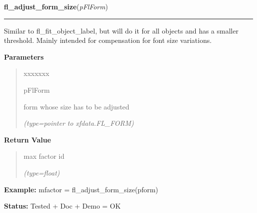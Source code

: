 \hspace{.8\funcindent}\begin{boxedminipage}{\funcwidth}

    \raggedright \textbf{fl\_adjust\_form\_size}(\textit{pFlForm})

    \vspace{-1.5ex}

    \rule{\textwidth}{0.5\fboxrule}
\setlength{\parskip}{2ex}
    Similar to fl\_fit\_object\_label, but will do it for all objects and 
    has a smaller threshold. Mainly intended for compensation for font size
    variations.

\setlength{\parskip}{1ex}
      \textbf{Parameters}
      \vspace{-1ex}

      \begin{quote}
        \begin{Ventry}{xxxxxxx}

          \item[pFlForm]

          form whose size has to be adjusted

            {\it (type=pointer to xfdata.FL\_FORM)}

        \end{Ventry}

      \end{quote}

      \textbf{Return Value}
    \vspace{-1ex}

      \begin{quote}
      max factor id

      {\it (type=float)}

      \end{quote}

\textbf{Example:} mfactor = fl\_adjust\_form\_size(pform)



\textbf{Status:} Tested + Doc + Demo = OK



    \end{boxedminipage}

    \label{xformslib:flbasic:fl_form_is_visible}

    \vspace{0.5ex}

